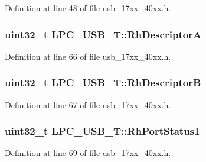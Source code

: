 Definition at line 48 of file usb\+\_\+17xx\+\_\+40xx.\+h.

\subsubsection[{\texorpdfstring{Rh\+DescriptorA}{RhDescriptorA}}]{ uint32\+\_\+t L\+P\+C\+\_\+\+U\+S\+B\+\_\+\+T\+::\+Rh\+DescriptorA}\hypertarget{structLPC__USB__T_ac128c5c4dbff91d959a79c3b8bfb1963}{}\label{structLPC__USB__T_ac128c5c4dbff91d959a79c3b8bfb1963}


Definition at line 66 of file usb\+\_\+17xx\+\_\+40xx.\+h.

\subsubsection[{\texorpdfstring{Rh\+DescriptorB}{RhDescriptorB}}]{ uint32\+\_\+t L\+P\+C\+\_\+\+U\+S\+B\+\_\+\+T\+::\+Rh\+DescriptorB}\hypertarget{structLPC__USB__T_ac2676c3bcbdc2ce29776afaa66c89a1e}{}\label{structLPC__USB__T_ac2676c3bcbdc2ce29776afaa66c89a1e}


Definition at line 67 of file usb\+\_\+17xx\+\_\+40xx.\+h.

\subsubsection[{\texorpdfstring{Rh\+Port\+Status1}{RhPortStatus1}}]{ uint32\+\_\+t L\+P\+C\+\_\+\+U\+S\+B\+\_\+\+T\+::\+Rh\+Port\+Status1}\hypertarget{structLPC__USB__T_a139d375a5db813cdae4ce830511be916}{}\label{structLPC__USB__T_a139d375a5db813cdae4ce830511be916}


Definition at line 69 of file usb\+\_\+17xx\+\_\+40xx.\+h.

